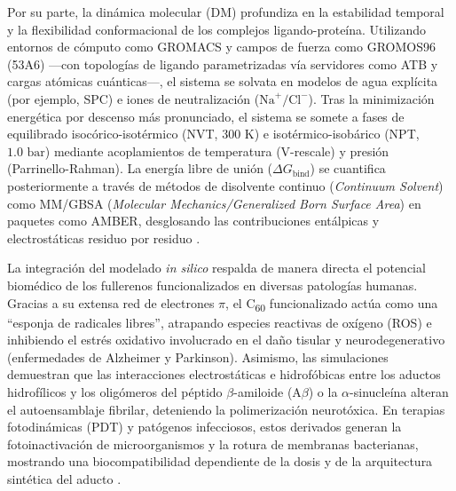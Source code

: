 Por su parte, la dinámica molecular (DM) profundiza en la estabilidad temporal y la flexibilidad conformacional de los complejos ligando-proteína. Utilizando entornos de cómputo como GROMACS y campos de fuerza como GROMOS96 (53A6) —con topologías de ligando parametrizadas vía servidores como ATB y cargas atómicas cuánticas—, el sistema se solvata en modelos de agua explícita (por ejemplo, SPC) e iones de neutralización ($\text{Na}^+/\text{Cl}^-$). Tras la minimización energética por descenso más pronunciado, el sistema se somete a fases de equilibrado isocórico-isotérmico (NVT, $300\text{ K}$) e isotérmico-isobárico (NPT, $1.0\text{ bar}$) mediante acoplamientos de temperatura (V-rescale) y presión (Parrinello-Rahman). La energía libre de unión ($\Delta G_{\text{bind}}$) se cuantifica posteriormente a través de métodos de disolvente continuo (\textit{Continuum Solvent}) como MM/GBSA (\textit{Molecular Mechanics/Generalized Born Surface Area}) en paquetes como AMBER, desglosando las contribuciones entálpicas y electrostáticas residuo por residuo \cite{nelson2022principios, liu2023fullerene}.

La integración del modelado \textit{in silico} respalda de manera directa el potencial biomédico de los fullerenos funcionalizados en diversas patologías humanas. Gracias a su extensa red de electrones $\pi$, el C\textsubscript{60} funcionalizado actúa como una ``esponja de radicales libres'', atrapando especies reactivas de oxígeno (ROS) e inhibiendo el estrés oxidativo involucrado en el daño tisular y neurodegenerativo (enfermedades de Alzheimer y Parkinson). Asimismo, las simulaciones demuestran que las interacciones electrostáticas e hidrofóbicas entre los aductos hidrofílicos y los oligómeros del péptido $\beta$-amiloide ($\text{A}\beta$) o la $\alpha$-sinucleína alteran el autoensamblaje fibrilar, deteniendo la polimerización neurotóxica. En terapias fotodinámicas (PDT) y patógenos infecciosos, estos derivados generan la fotoinactivación de microorganismos y la rotura de membranas bacterianas, mostrando una biocompatibilidad dependiente de la dosis y de la arquitectura sintética del aducto \cite{wilson2024role, wang2024strain,  celaya2022administracion, partha2009biomedical}.
  


















